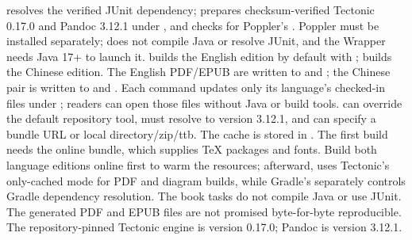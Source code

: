  resolves the verified JUnit dependency;  prepares checksum-verified Tectonic 0.17.0 and Pandoc 3.12.1 under , and checks for Poppler's . Poppler must be installed separately;  does not compile Java or resolve JUnit, and the Wrapper needs Java 17+ to launch it.  builds the English edition by default with ;  builds the Chinese edition. The English PDF/EPUB are written to  and ; the Chinese pair is written to  and . Each command updates only its language's checked-in files under ; readers can open those files without Java or build tools.  can override the default repository tool,  must resolve to version 3.12.1, and  can specify a bundle URL or local directory/zip/ttb. The cache is stored in . The first build needs the online bundle, which supplies TeX packages and fonts. Build both language editions online first to warm the resources; afterward,  uses Tectonic's only-cached mode for PDF and diagram builds, while Gradle's  separately controls Gradle dependency resolution. The book tasks do not compile Java or use JUnit. The generated PDF and EPUB files are not promised byte-for-byte reproducible.
The repository-pinned Tectonic engine is version 0.17.0; Pandoc is version 3.12.1.
